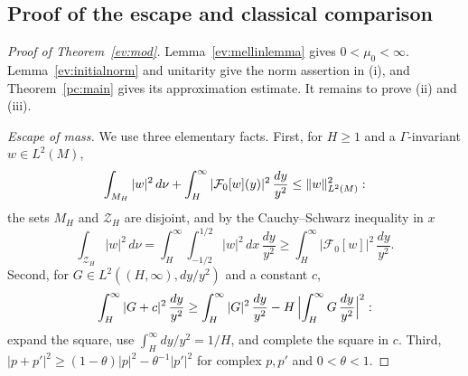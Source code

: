 \subsection{Proof of the escape and classical comparison}\label{subsec:ev-final}
\begin{proof}[Proof of Theorem~\ref{ev:mod}]
Lemma~\ref{ev:mellinlemma} gives $0<\mu_0<\infty$. Lemma~\ref{ev:initialnorm} and unitarity give the norm assertion in (i), and Theorem~\ref{pc:main} gives its approximation estimate. It remains to prove (ii) and (iii).

\emph{Escape of mass.} We use three elementary facts. First, for $H\ge1$ and a $\Gamma$-invariant $w\in L^2(M)$,
\begin{equation}\label{ev:cusp}
  \int_{M_H}|w|^2\,d\nu+\int_H^\infty|\mathcal F_0[w](y)|^2\,\frac{dy}{y^2}\le\lVert w\rVert^2_{L^2(M)} :
\end{equation}
the sets $M_H$ and $\mathcal Z_H$ are disjoint, and by the Cauchy--Schwarz inequality in $x$
\[
  \int_{\mathcal Z_H}|w|^2\,d\nu=\int_H^\infty\!\!\int_{-1/2}^{1/2}|w|^2\,dx\,\frac{dy}{y^2}\ge\int_H^\infty|\mathcal F_0[w]|^2\,\frac{dy}{y^2}.
\]
Second, for $G\in L^2((H,\infty),dy/y^2)$ and a constant $c$,
\begin{equation}\label{ev:proj}
  \int_H^\infty|G+c|^2\,\frac{dy}{y^2}\ge\int_H^\infty|G|^2\,\frac{dy}{y^2}-H\,\Bigl|\int_H^\infty G\,\frac{dy}{y^2}\Bigr|^2 :
\end{equation}
expand the square, use $\int_H^\infty dy/y^2=1/H$, and complete the square in $c$. Third, $|p+p'|^2\ge(1-\theta)|p|^2-\theta^{-1}|p'|^2$ for complex $p,p'$ and
$0<\theta<1$.


\end{proof}
